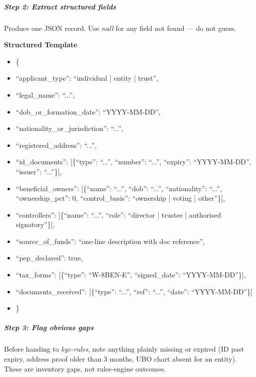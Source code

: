 \documentclass[11pt]{article}
\begin{document}
\subparagraph{Step 2: Extract structured fields}\mbox{}\par

Produce one JSON record. Use \emph{null} for any field not found — do not guess.


\textbf{Structured Template}
\begin{itemize}[leftmargin=*,itemsep=2pt,topsep=2pt]
\item {} \{
\item {} ``applicant\_\allowbreak{}type'': ``individual | entity | trust'',
\item {} ``legal\_\allowbreak{}name'': ``...'',
\item {} ``dob\_\allowbreak{}or\_\allowbreak{}formation\_\allowbreak{}date'': ``YYYY-MM-DD'',
\item {} ``nationality\_\allowbreak{}or\_\allowbreak{}jurisdiction'': ``...'',
\item {} ``registered\_\allowbreak{}address'': ``...'',
\item {} ``id\_\allowbreak{}documents'': [\{``type'': ``...'', ``number'': ``...'', ``expiry'': ``YYYY-MM-DD'', ``issuer'': ``...''\}],
\item {} ``beneficial\_\allowbreak{}owners'': [\{``name'': ``...'', ``dob'': ``...'', ``nationality'': ``...'', ``ownership\_\allowbreak{}pct'': 0, ``control\_\allowbreak{}basis'': ``ownership | voting | other''\}],
\item {} ``controllers'': [\{``name'': ``...'', ``role'': ``director | trustee | authorised signatory''\}],
\item {} ``source\_\allowbreak{}of\_\allowbreak{}funds'': ``one-line description with doc reference'',
\item {} ``pep\_\allowbreak{}declared'': true,
\item {} ``tax\_\allowbreak{}forms'': [\{``type'': ``W-8BEN-E'', ``signed\_\allowbreak{}date'': ``YYYY-MM-DD''\}],
\item {} ``documents\_\allowbreak{}received'': [\{``type'': ``...'', ``ref'': ``...'', ``date'': ``YYYY-MM-DD''\}]
\item {} \}
\end{itemize}

\subparagraph{Step 3: Flag obvious gaps}\mbox{}\par

Before handing to \emph{kyc-rules}, note anything plainly missing or expired (ID past expiry, address proof older than 3 months, UBO chart absent for an entity). These are inventory gaps, not rules-engine outcomes.
\end{document}
